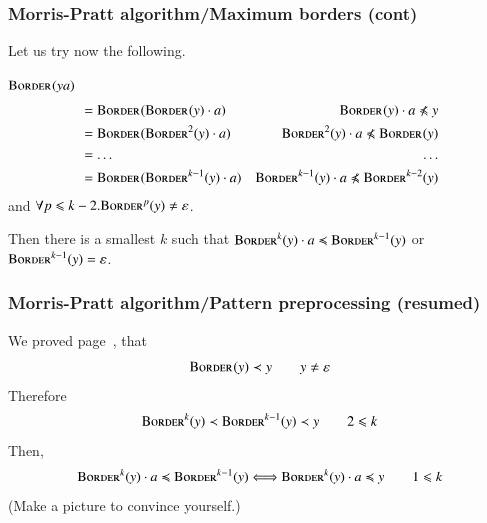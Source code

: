 %
\begin{frame}
\frametitle{Morris-Pratt algorithm/Maximum borders (cont)}

Let us try now the following.

\bigskip

\(\textsc{Border}^{}(ya)\)
\begin{align*}
&= \Border{}{\Border{}{y} \cdot a}
                &  \Border{}{y} \cdot a \npreccurlyeq y\\
                &= \Border{}{\Border{2}{y} \cdot a}
                &  \Border{2}{y} \cdot a \npreccurlyeq \Border{}{y}\\
                &= \ldots
                & \ldots\\
                &= \Border{}{\Border{k-1}{y} \cdot a}
                & \Border{k-1}{y} \cdot a \npreccurlyeq \Border{k-2}{y}
\end{align*}
and \(\forall p \leqslant k-2.\textsc{Border}^{p}(y) \neq \varepsilon\).

\bigskip

\noindent Then there is a smallest \(k\) such that \(\textsc{Border}^{k}(y)
\cdot a \preccurlyeq \textsc{Border}^{k-1}(y)\) or \(\textsc{Border}^{k-1}(y) =
\varepsilon\).

\end{frame}

%
\begin{frame}
\frametitle{Morris-Pratt algorithm/Pattern preprocessing (resumed)}

We proved page~\pageref{decreasing_borders_proof}, that
\[
\textsc{Border}^{}(y) \prec y \qquad y \neq \varepsilon
\]
Therefore
\[
\textsc{Border}^{k}(y) \prec \textsc{Border}^{k-1}(y) \prec y
\qquad 2 \leqslant k
\]
Then,
\[
\textsc{Border}^{k}(y) \cdot a \preccurlyeq \textsc{Border}^{k-1}(y)
\Longleftrightarrow
\textsc{Border}^{k}(y) \cdot a \preccurlyeq y
\qquad 1 \leqslant k
\]
(Make a picture to convince yourself.)

\end{frame}


